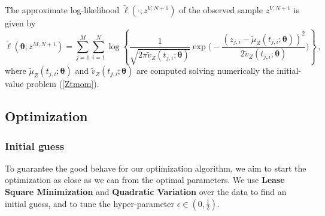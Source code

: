 \documentclass[11pt]{article}
\theoremstyle{definition}
\begin{document}
The approximate log-likelihood $\tilde{\ell}(\cdot ; z^{V, N+1})$ of the observed sample $z^{V, N+1}$ is given by
\begin{equation}
\tilde{\ell} (\bm{\theta}; z^{M,N +1}) = \sum_{j=1}^M \sum_{i=1}^N \log \left\{ \frac{1}{\sqrt{2 \pi \tilde{v}_Z(t_{j,i}; \bm{\theta})}} \exp \Bigg( -\frac{(z_{j,i} - \tilde{\mu}_Z(t_{j,i};\bm{\theta} ))^2}{2 \tilde{v}_Z(t_{j,i}; \bm{\theta})} \Bigg) \right\}   \,,   \label{loglikelihoodZ}
\end{equation}
where $\tilde{\mu}_Z(t_{j,i};\bm{\theta} )$ and $\tilde{v}_Z(t_{j,i};\bm{\theta} )$ are computed solving numerically the initial-value problem (\ref{Ztmom}). 

\subsection{Optimization} \label{opt_sec}

\subsubsection{Initial guess}

To guarantee the good behave for our optimization algorithm, we aim to start the optimization as close as we can from the optimal parameters. We use \textbf{Lease Square Minimization} and \textbf{Quadratic Variation} over the data to find an initial guess, and to tune the hyper-parameter $\epsilon\in(0,\frac{1}{2})$.
\end{document}
